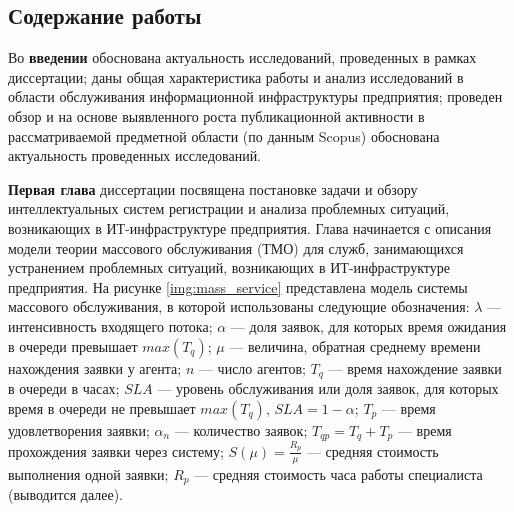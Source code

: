 \newcommand{\actuality}{\underline{\textbf{Актуальность темы.}}}
\newcommand{\aim}{{\textbf{Целью}}}
\newcommand{\tasks}{{\textbf{задачи}}}
\newcommand{\scope}{{\textbf{Область исследования}}}
\newcommand{\subject}{{\textbf{Предметом исследования}}}
\newcommand{\methods}{{\textbf{Методы исследования}}}
\newcommand{\defpositions}{{\textbf{Основные положения, выносимые на~защиту:}}}
\newcommand{\novelty}{{\textbf{Научная новизна}}}
\newcommand{\influence}{{\textbf{Практическая значимость.}}}
\newcommand{\reliability}{{\textbf{Достоверность}}}
\newcommand{\probation}{{\textbf{Апробация работы.}}}
\newcommand{\contribution}{{\textbf{Личный вклад.}}}
\newcommand{\publications}{{\textbf{Публикации.}}}




\subsection*{Содержание работы}
Во \textbf{введении} обоснована актуальность исследований, проведенных в рамках диссертации; даны общая характеристика работы и анализ исследований в области обслуживания информационной инфраструктуры предприятия; проведен обзор и на основе выявленного роста публикационной активности в рассматриваемой предметной области (по данным Scopus) обоснована актуальность проведенных исследований. \par

\textbf{Первая глава} диссертации посвящена постановке задачи и обзору интеллектуальных систем регистрации и анализа проблемных ситуаций, возникающих в ИТ-инфраструктуре предприятия.
Глава начинается с описания модели теории массового обслуживания (ТМО) для служб, занимающихся устранением проблемных ситуаций, возникающих в ИТ-инфраструктуре предприятия. На рисунке \ref{img:mass_service} представлена модель системы массового обслуживания, в которой использованы следующие обозначения: $\lambda$ --- интенсивность входящего потока;  
$\alpha$ --- доля заявок, для которых время ожидания в очереди превышает $max(T_q)$;       
$\mu$ --- величина, обратная среднему времени нахождения заявки у агента;
$n$ --- число агентов;
$T_q$ --- время нахождение заявки в очереди в часах;
$SLA$ --- уровень обслуживания или доля заявок, для которых время в очереди не превышает $max(T_q)$, $SLA=1-\alpha$;
 $T_p$ --- время удовлетворения заявки;
 $\alpha_n$ --- количество заявок;
 $T_{qp}=T_q+T_p$ --- время прохождения заявки через систему;
 $S(\mu)= \frac{R_p}{\mu} $ --- средняя стоимость выполнения одной заявки;
 $R_p$ --- средняя стоимость часа работы специалиста (выводится далее).

